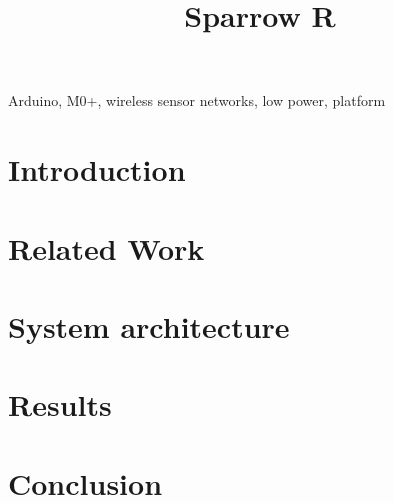 \documentclass[conference]{IEEEtran}
\begin{document}
\title{Sparrow R}

\author{
  }


\maketitle

\begin{abstract}

\end{abstract}

\begin{IEEEkeywords}
Arduino, M0+, wireless sensor networks, low power, platform
\end{IEEEkeywords}

\section{Introduction}
\label{sec:introduction}


\section{Related Work}
\label{sec:related}


\section{System architecture}
\label{sec:architecture}


\section{Results}
\label{sec:results}



\section{Conclusion}
\label{sec:conclusion}






\end{document}
